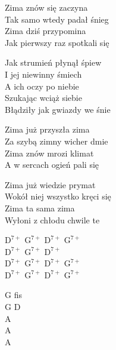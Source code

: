 \begin{textn}
    Zima znów się zaczyna\\
    Tak samo wtedy padał śnieg\\
    Zima dziś przypomina\\
    Jak pierwszy raz spotkali się

    \vin Jak strumień płynął śpiew\\
    \vin I jej niewinny śmiech\\
    \vin A ich oczy po niebie\\
    \vin Szukając wciąż siebie\\
    \vin Błądziły jak gwiazdy we śnie

    Zima już przyszła zima\\
    Za szybą zimny wicher dmie\\
    Zima znów mrozi klimat\\
    A w sercach ogień pali się

    Zima już wiedzie prymat\\
    Wokół niej wszystko kręci się\\
    Zima ta sama zima\\
    Wyłoni z chłodu chwile te
\end{textn}
\begin{chordw}
    $\mathrm{D^{7+}}$ $\mathrm{G^{7+}}$ $\mathrm{D^{7+}}$ $\mathrm{G^{7+}}$\\
    $\mathrm{D^{7+}}$ $\mathrm{G^{7+}}$ $\mathrm{D^{7+}}$\\
    $\mathrm{D^{7+}}$ $\mathrm{G^{7+}}$ $\mathrm{D^{7+}}$ $\mathrm{G^{7+}}$\\
    $\mathrm{D^{7+}}$ $\mathrm{G^{7+}}$ $\mathrm{D^{7+}}$ $\mathrm{G^{7+}}$

    G fis\\
    G D\\
    A\\
    A\\
    A
\end{chordw}
